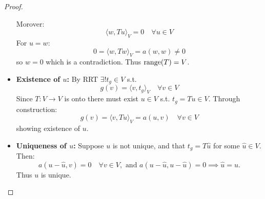 \begin{proof}
\begin{itemize}
              Morover:
              \[
                  \langle w, T u \rangle_V = 0 \quad \forall u \in V
              \]
              For $u = w$:
              \[
                  0 = \langle w, T w \rangle_V = a(w, w) \neq 0
              \]
              so $w = 0$ which is a contradiction.
              Thus $\operatorname{range}(T) = V$.
        \item \textbf{Existence of $u$:} By RRT $\exists! t_g \in V$ s.t.
              \[
                  g(v) = \langle v, t_g \rangle_V \quad \forall v \in V
              \]
              Since $T: V \to V$ is onto there must exist $u \in V$ s.t. $t_g = T u \in V$. Through construction:
              \[
                  g(v) = \langle v, T u \rangle_V = a(u, v) \quad \forall v \in V
              \]
              showing existence of $u$.
        \item \textbf{Uniqueness of $u$:} Suppose $u$ is not unique, and that $t_g = T \hat{u}$ for some $\hat{u} \in V$. Then:
              \[
                  a(u - \hat{u}, v) = 0 \quad \forall v \in V, \text{ and } a(u - \hat{u}, u - \hat{u}) = 0 \implies \hat{u} = u.
              \]
              Thus $u$ is unique.
    \end{itemize}
\end{proof}

